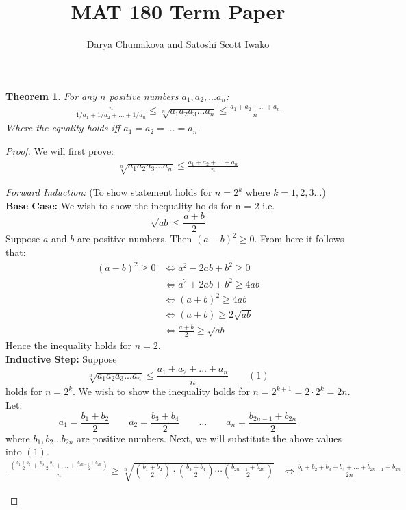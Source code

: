 \documentclass{report}
\newtheorem*{thm}{Theorem}
\begin{document}
\title{MAT 180 Term Paper}
\author{Darya Chumakova and Satoshi Scott Iwako}
\maketitle

\begin{thm}
For any $n$ positive numbers $a_1, a_2, ... a_n$: 
\begin{align*}
\frac{n}{1/a_1 + 1/a_2 + ... + 1/a_n} \leq \sqrt[n]{a_1 a_2 a_3 ... a_n} \leq \frac{a_1 + a_2 + ... + a_n}{n}
\end{align*}
Where the equality holds iff $a_1 = a_2 = ... = a_n$.
\end{thm}

\begin{proof}
We will first prove:
\begin{align*}
\sqrt[n]{a_1 a_2 a_3 ... a_n} \leq \frac{a_1 + a_2 + ... + a_n}{n}
\end{align*}

\begin{flushleft}
\textit{Forward Induction:} (To show statement holds for $n = 2^k$ where $k = 1, 2, 3...$) \\
\textbf{Base Case:} We wish to show the inequality holds for n = 2 i.e. $$\sqrt{ab} \leq \frac{a+b}{2}$$
Suppose $a$ and $b$ are positive numbers. Then $(a-b)^2 \geq 0$. From here it follows that:
\begin{align*}
(a-b)^2 \geq 0 &\iff a^2 - 2ab + b^2 \geq 0 \\
			   &\iff a^2 + 2ab + b^2 \geq 4ab \\
			   &\iff (a+b)^2 \geq 4ab \\
			   &\iff (a+b) \geq 2\sqrt{ab} \\
			   &\iff \frac{a+b}{2} \geq \sqrt{ab}
\end{align*}
Hence the inequality holds for $n=2$.\\
\textbf{Inductive Step:} Suppose $$\sqrt[n]{a_1 a_2 a_3 ... a_n} \leq \frac{a_1 + a_2 + ... + a_n}{n} \qquad (1)$$ holds for $n = 2^k$. We wish to show the inequality holds for $n = 2^{k+1} = 2 \cdot 2^k = 2n$. Let:
$$a_1 = \frac{b_1 + b_2}{2} \qquad a_2 = \frac{b_3 + b_4}{2} \qquad \ldots \qquad a_n = \frac{b_{2n-1} + b_{2n}}{2}$$
where $b_1, b_2 ... b_{2n}$ are positive numbers. Next, we will substitute the above values into $(1)$. \\
\begin{align*}
\frac{ (\frac{b_1 + b_2}{2} + \frac{b_3 + b_4}{2} + \ldots + \frac{b_{2n-1} + b_{2n}}{2}) } {n} \geq \sqrt[n]{(\frac{b_1 + b_2}{2})\cdot(\frac{b_3 + b_4}{2})\cdots (\frac{b_{2n-1} + b_{2n}}{2})} &\iff
\frac{b_1 + b_2 + b_3 + b_4 + \ldots + b_{2n-1} + b_{2n}}{2n}
\end{align*}



\end{flushleft}
\end{proof}
\end{document}

